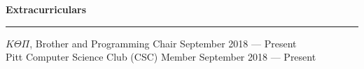\documentclass[11pt]{article}
\begin{document}
\begin{flushleft}
		\vspace{1.75mm}
		{\large \raggedright \textbf{Extracurriculars}}
		\vspace{1.5mm}
	
		\hrule
	
		\vspace{2.25mm}
		$K\Theta\Pi$, Brother and Programming Chair \hfill September 2018 --- Present\\
		Pitt Computer Science Club (CSC) Member \hfill September 2018 --- Present
	\end{flushleft}
\end{document}
